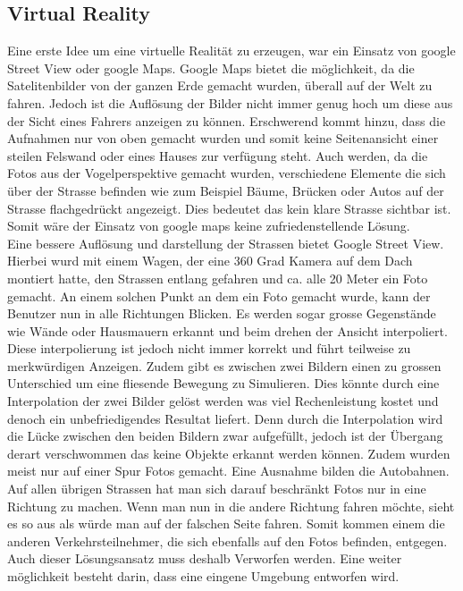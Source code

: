 \subsection{Virtual Reality}
Eine erste Idee um eine virtuelle Realität zu erzeugen, war ein Einsatz von google Street View oder google Maps. Google Maps bietet die möglichkeit, da die Satelitenbilder von der ganzen Erde gemacht wurden, überall auf der Welt zu fahren. Jedoch ist die Auflösung der Bilder nicht immer genug hoch um diese aus der Sicht eines Fahrers anzeigen zu können. Erschwerend kommt hinzu, dass die Aufnahmen nur von oben gemacht wurden und somit keine Seitenansicht einer steilen Felswand oder eines Hauses zur verfügung steht. Auch werden, da die Fotos aus der Vogelperspektive gemacht wurden, verschiedene Elemente die sich über der Strasse befinden wie zum Beispiel Bäume, Brücken oder Autos auf der Strasse flachgedrückt angezeigt.  Dies bedeutet das kein klare Strasse sichtbar ist. Somit wäre der Einsatz von google maps keine zufriedenstellende Lösung. \\
Eine bessere Auflösung und darstellung der Strassen bietet Google Street View. Hierbei wurd mit einem Wagen, der eine 360 Grad Kamera auf dem Dach montiert hatte, den Strassen entlang gefahren und ca. alle 20 Meter ein Foto gemacht. An einem solchen Punkt an dem ein Foto gemacht wurde, kann der Benutzer nun in alle Richtungen Blicken. Es werden sogar grosse Gegenstände wie Wände oder Hausmauern erkannt und beim drehen der Ansicht interpoliert. Diese interpolierung ist jedoch nicht immer korrekt und führt teilweise zu merkwürdigen Anzeigen. Zudem gibt es zwischen zwei Bildern einen zu grossen Unterschied um eine fliesende Bewegung zu Simulieren. Dies könnte durch eine Interpolation der zwei Bilder gelöst werden was viel Rechenleistung kostet und denoch ein unbefriedigendes Resultat liefert. Denn durch die Interpolation wird die Lücke zwischen den beiden Bildern zwar aufgefüllt, jedoch ist der Übergang derart verschwommen das keine Objekte erkannt werden können. 
Zudem wurden meist nur auf einer Spur Fotos gemacht. Eine Ausnahme bilden die Autobahnen. Auf allen übrigen Strassen hat man sich darauf beschränkt Fotos nur in eine Richtung zu machen. Wenn man nun in die andere Richtung fahren möchte, sieht es so aus als würde man auf der falschen Seite fahren. Somit kommen einem die anderen Verkehrsteilnehmer, die sich ebenfalls auf den Fotos befinden, entgegen. Auch dieser Lösungsansatz muss deshalb Verworfen werden. Eine weiter möglichkeit besteht darin, dass eine eingene Umgebung entworfen wird.\\
